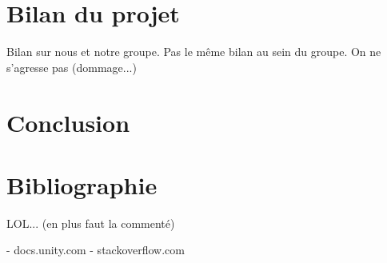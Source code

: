 ﻿\documentclass[12pt]{article}
\begin{document}
\section{Bilan du projet}
Bilan sur nous et notre groupe.
Pas le même bilan au sein du groupe.
On ne s'agresse pas (dommage...)

\section{Conclusion}

\section{Bibliographie}
LOL... (en plus faut la commenté)

- docs.unity.com
- stackoverflow.com
\end{document}
